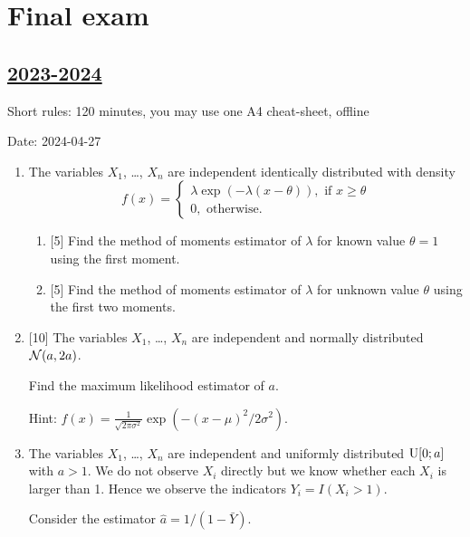 
\newpage
\thispagestyle{empty}
\section{Final exam}

\subsection[2023-2024]{\hyperref[sec:sol_kr_04_2023_2024]{2023-2024}}
\label{sec:kr_04_2023_2024} %

Short rules: 120 minutes, you may use one A4 cheat-sheet, offline

Date: 2024-04-27

\begin{enumerate}
    \item The variables $X_1$, \ldots, $X_n$ are independent identically distributed with density 
    \[
    f(x) = \begin{cases}
      \lambda \exp(-\lambda (x - \theta)), \text{ if } x\geq \theta \\
      0, \text{ otherwise}.
    \end{cases}  
    \]
    \begin{enumerate}
      \item {[5]} Find the method of moments estimator of $\lambda$ for known value $\theta = 1$ using the first moment. 
      \item {[5]} Find the method of moments estimator of $\lambda$ for unknown value $\theta$ using the first two moments. 
    \end{enumerate}

    \item {[10]} The variables $X_1$, \ldots, $X_n$ are independent and normally distributed $\mathcal{N}(a, 2a)$.
  
    Find the maximum likelihood estimator of $a$.
  
    Hint: $f(x) = \frac{1}{\sqrt{2\pi \sigma^2}} \exp(-(x-\mu)^2/2\sigma^2)$.

    \item The variables $X_1$, \ldots, $X_n$ are independent and uniformly distributed $\mathrm{U}[0;a]$ with $a>1$.
    We do not observe $X_i$ directly but we know whether each $X_i$ is larger than 1. 
    Hence we observe the indicators $Y_i = I(X_i > 1)$.
  
    Consider the estimator $\hat a = 1 / (1 - \bar Y)$.
  

\end{enumerate}
